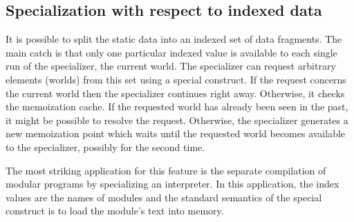 \documentclass[11pt]{article}
\begin{document}
\subsection{Specialization with respect to indexed data}
\label{sec:modular-data}

It is possible to split the static data into an indexed set of data
fragments. The main catch is that only one particular indexed value is
available to each single run of the specializer, the current world. The
specializer can request arbitrary elements (worlds) from this set using a special
construct. If the request concerns the current world then the specializer
continues right away. Otherwise, it checks the memoization cache. If the
requested world has already been seen in the past, it might be possible to
resolve the request. Otherwise, the specializer generates a new memoization
point which waits until the requested world becomes available to the
specializer, possibly for the second time.

The most striking application for this feature is
the separate compilation of modular programs by specializing an interpreter. In 
this application, the index values are the names of modules and the standard
semantics of the special construct is to load the module's text into memory.
\end{document}

